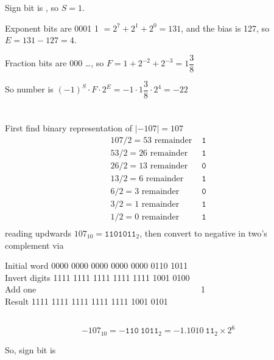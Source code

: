 \documentclass[10pt]{article} %
\begin{document}
Sign bit is {}, so $S = 1$.

Exponent bits are { 0001 1} $=2^7+2^1+2^0=131$, and the bias is 127, so $E=131-127=4$.

Fraction bits are { 000 \ldots}, so $F=1+2^{-2}+2^{-3} = 1\dfrac{3}{8}$

So number is $(-1)^S \cdot F \cdot 2^ E = -1 \cdot 1\dfrac{3}{8} \cdot 2^4 = -22$
\section{}
\subsection{}
First find binary representation of $|-107| = 107$
\[
\begin{aligned}
107 / 2 = 53 \text{ remainder } & \mathtt{1} \\
53 / 2 = 26 \text{ remainder } & \mathtt{1} \\
26 / 2 = 13 \text{ remainder } & \mathtt{0} \\
13 / 2 = 6 \text{ remainder } & \mathtt{1} \\
6 / 2 = 3 \text{ remainder } & \mathtt{0} \\
3 / 2 = 1 \text{ remainder } & \mathtt{1} \\
1 / 2 = 0 \text{ remainder } & \mathtt{1} \\
\end{aligned}
\]
reading updwards $107_{10} = \mathtt{110 1011}_2$, then convert to negative in two's complement via
\begin {tabbing}
Initial word \hspace{30px} \= { 0000 0000 0000 0000 0000 0110 1011} \\
Invert digits \> { 1111 1111 1111 1111 1111 1001 0100} \\
Add one \> {\ttfamily \ \ \ \ \ \ \ \ \ \ \ \ \ \ \ \ \ \ \ \ \ \ \ \ \ \ \ \ \ \ \ \ \ \ \ \ \ \ 1}\\
Result \> { 1111 1111 1111 1111 1111 1001 0101} \\
\end{tabbing}
\subsection{}
\[-107_{10} = -\mathtt{110 \ 1011}_2 = -\mathtt{1.1010 \ 11}_2 \times 2^6\]

So, sign bit is {}
\end{document}
